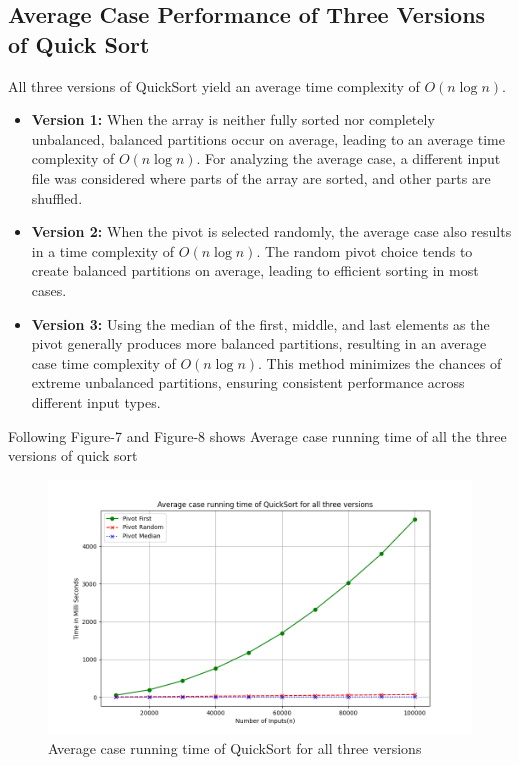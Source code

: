 \documentclass[a4paper,12pt]{report}
\begin{document}
\subsection{Average Case Performance of Three Versions of Quick Sort}
All three versions of QuickSort yield an average time complexity of \(O(n \log n)\).
\begin{itemize}
	\item \textbf{Version 1:} When the array is neither fully sorted nor completely unbalanced, balanced partitions occur on average, leading to an average time complexity of \(O(n \log n)\). For analyzing the average case, a different input file was considered where parts of the array are sorted, and other parts are shuffled.
	
	\item \textbf{Version 2:} When the pivot is selected randomly, the average case also results in a time complexity of \(O(n \log n)\). The random pivot choice tends to create balanced partitions on average, leading to efficient sorting in most cases.
	
	\item \textbf{Version 3:} Using the median of the first, middle, and last elements as the pivot generally produces more balanced partitions, resulting in an average case time complexity of \(O(n \log n)\). This method minimizes the chances of extreme unbalanced partitions, ensuring consistent performance across different input types.
\end{itemize}
Following Figure-7 and Figure-8 shows Average case running time of all the three versions of quick sort
\begin{figure}[H]
	\centering
	\includegraphics[width=1.1\textwidth]{./Average_case_QuickSort.png}
	\caption{Average case running time of QuickSort for all three versions}
	\label{fig:Average case quicksort}
\end{figure}
\end{document}
